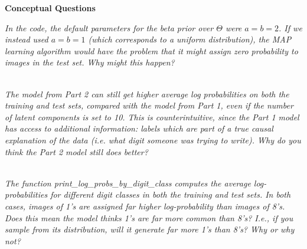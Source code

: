 \documentclass{myhw}
\begin{document}
\begin{homeworkProblem}
\textbf{Conceptual Questions}
\begin{homeworkSection}	
\emph{In the code, the default parameters for the beta prior over $\Theta$ were $a = b = 2$. If we instead used $a = b = 1$ (which corresponds to a uniform distribution), the MAP learning algorithm would have the problem that it might assign zero probability to images in the test set. Why might this happen?} \\
\\
\end{homeworkSection}
\begin{homeworkSection}	
\emph{The model from Part 2 can still get higher average log probabilities on both the training and test sets, compared with the model from Part 1, even if the number of latent components is set to 10. This is counterintuitive, since the Part 1 model has access to additional information: labels which are part of a true causal explanation of the data (i.e. what digit someone was trying to write). Why do you think the Part 2 model still does better?} \\
\\
\end{homeworkSection}
\begin{homeworkSection}	
\emph{The function print\_log\_probs\_by\_digit\_class computes the average log-probabilities for different digit classes in both the training and test sets. In both cases, images of 1’s are assigned far higher log-probability than images of 8’s. Does this mean the model thinks 1’s are far more common than 8’s? I.e., if you sample from its distribution, will it generate far more 1’s than 8’s? Why or why not?} \\
\\
\end{homeworkSection}
\end{homeworkProblem}
\end{document}
